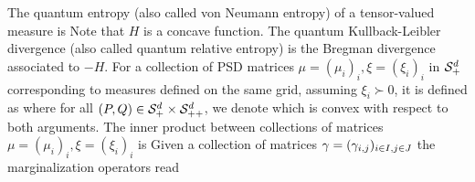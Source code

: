 The quantum entropy (also called von Neumann entropy) of a tensor-valued measure is 
Note that $H$ is a concave function. 
%
The quantum Kullback-Leibler divergence (also called quantum relative entropy) is the Bregman divergence associated to $-H$. For a collection of PSD matrices $\mu=(\mu_i)_i, \xi=(\xi_i)_i$ in $\mathcal{S}_+^d$ corresponding to measures defined on the same grid, assuming $\xi_i \succ 0$, it is defined as
where for all $(P,Q) \in \mathcal{S}_{+}^d \times \mathcal{S}_{++}^d$, we denote
which is convex with respect to both arguments. 
%
The inner product between collections of matrices $\mu=(\mu_i)_i, \xi=(\xi_i)_i$ is 
Given a collection of matrices $\gamma=(\gamma_{i,j})_{i \in I,j \in J}$ the marginalization operators read
